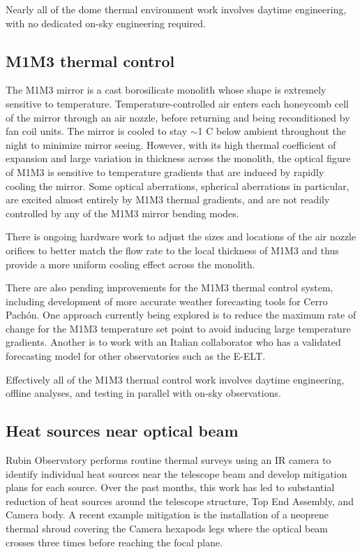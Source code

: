 \documentclass[SO,lsst,authoryear,toc]{lsstdoc}
\begin{document}
Nearly all of the dome thermal environment work involves daytime engineering, with no dedicated on-sky engineering required.

\subsection{M1M3 thermal control}
\label{sec:m1m3_thermal}

The M1M3 mirror is a cast borosilicate monolith whose shape is extremely sensitive to temperature.
Temperature-controlled air enters each honeycomb cell of the mirror through an air nozzle, before returning and being reconditioned by fan coil units.
The mirror is cooled to stay $\sim$1 C below ambient throughout the night to minimize mirror seeing. However, with its high thermal coefficient of expansion and large variation in thickness across the monolith, the optical figure of M1M3 is sensitive to temperature gradients that are induced by rapidly cooling the mirror.
Some optical aberrations, spherical aberrations in particular, are excited almost entirely by M1M3 thermal gradients, and are not readily controlled by any of the M1M3 mirror bending modes.

There is ongoing hardware work to adjust the sizes and locations of the air nozzle orifices to better match the flow rate to the local thickness of M1M3 and thus provide a more uniform cooling effect across the monolith.

There are also pending improvements for the M1M3 thermal control system, including development of more accurate weather forecasting tools for Cerro Pach\'{o}n.
One approach currently being explored is to reduce the maximum rate of change for the M1M3 temperature set point to avoid inducing large temperature gradients.
Another is to work with an Italian collaborator who has a validated forecasting model for other observatories such as the E-ELT.

Effectively all of the M1M3 thermal control work involves daytime engineering, offline analyses, and testing in parallel with on-sky observations.

\subsection{Heat sources near optical beam}
\label{sec:beam}

Rubin Observatory performs routine thermal surveys using an IR camera to identify individual heat sources near the telescope beam and develop mitigation plans for each source. Over the past months, this work has led to substantial reduction of heat sources around the telescope structure, Top End Assembly, and Camera body.
A recent example mitigation is the installation of a neoprene thermal shroud covering the Camera hexapods legs where the optical beam crosses three times before reaching the focal plane.
\end{document}
